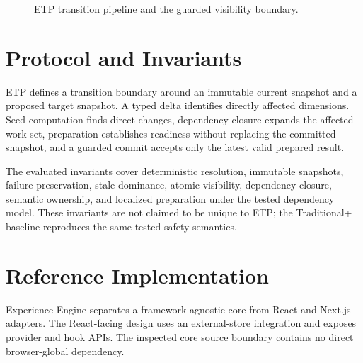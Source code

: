 \documentclass[manuscript,anonymous]{acmart}
\begin{document}
\begin{figure}[t]
\centering
{}
\caption{ETP transition pipeline and the guarded visibility boundary.}
\label{fig:etp-pipeline}
\end{figure}

\section{Protocol and Invariants}
ETP defines a transition boundary around an immutable current snapshot and a proposed target
snapshot. A typed delta identifies directly affected dimensions. Seed computation finds direct
changes, dependency closure expands the affected work set, preparation establishes readiness
without replacing the committed snapshot, and a guarded commit accepts only the latest valid
prepared result.

The evaluated invariants cover deterministic resolution, immutable snapshots, failure
preservation, stale dominance, atomic visibility, dependency closure, semantic ownership,
and localized preparation under the tested dependency model. These invariants are not claimed
to be unique to ETP; the Traditional+ baseline reproduces the same tested safety semantics.

\section{Reference Implementation}
Experience Engine separates a framework-agnostic core from React and Next.js adapters.
The React-facing design uses an external-store integration and exposes provider and hook APIs.
The inspected core source boundary contains no direct browser-global dependency.
\end{document}

